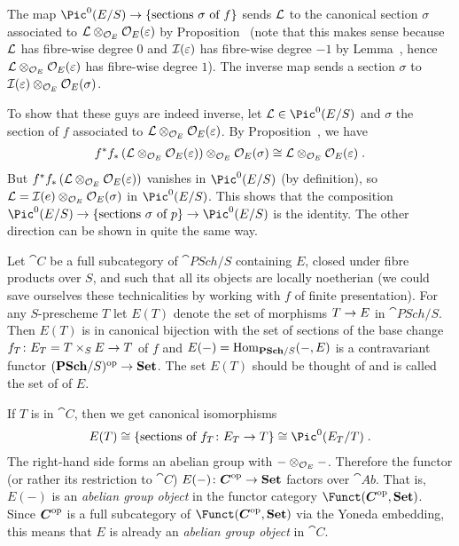 \documentclass[a4paper,parskip=half,numbers=enddot, DIV=12]{scrreprt}
\begin{document}
	The map $\Pic^0(E/S)\morphism\{\text{sections }\sigma\text{ of }f\}$ sends $\mathcal{L}$ to the canonical section $\sigma$ associated to $\mathcal{L}\otimes_{\mathcal{O}_E}\mathcal{O}_E(\varepsilon)$ by Proposition~ (note that this makes sense because $\mathcal{L}$ has fibre-wise degree $0$ and $\mathcal{I}(\varepsilon)$ has fibre-wise degree $-1$ by Lemma~, hence $\mathcal{L}\otimes_{\mathcal{O}_E}\mathcal{O}_E(\varepsilon)$ has fibre-wise degree $1$). The inverse map sends a section $\sigma$ to $\mathcal{I}(\varepsilon)\otimes_{\mathcal{O}_E}\mathcal{O}_E(\sigma)$.
	
	To show that these guys are indeed inverse, let $\Ll\in\Pic^0(E/S)$ and $\sigma$ the section of $f$ associated to $\mathcal{L}\otimes_{\mathcal{O}_E}\mathcal{O}_E(\varepsilon)$. By Proposition~, we have
	\begin{align*}
		f^*f_*\left(\mathcal{L}\otimes_{\mathcal{O}_E}\mathcal{O}_E(\varepsilon)\right)\otimes_{\mathcal{O}_E}\mathcal{O}_E(\sigma)\cong\mathcal{L}\otimes_{\mathcal{O}_E}\mathcal{O}_E(\varepsilon)\;.
	\end{align*}
	But $f^*f_*\left(\mathcal{L}\otimes_{\mathcal{O}_E}\mathcal{O}_E(\varepsilon)\right)$ vanishes in $\Pic^0(E/S)$ (by definition), so $\mathcal{L}=\mathcal{I}(e)\otimes_{\mathcal{O}_E}\mathcal{O}_E(\sigma)$ in $\Pic^0(E/S)$. This shows that the composition $\Pic^0(E/S)\morphism\{\text{sections }\sigma\text{ of }p\}\morphism\Pic^0(E/S)$ is the identity. The other direction can be shown in quite the same way.
	
	Let $\cat C$ be a full subcategory of $\cat{PSch}/S$ containing $E$, closed under fibre products over $S$, and such that all its objects are locally noetherian (we could save ourselves these technicalities by working with $f$ of finite presentation). For any $S$-prescheme $T$ let $E(T)$ denote the set of morphisms $T\morphism E$ in $\cat{PSch}/S$. Then $E(T)$ is in canonical bijection with the set of sections of the base change $f_T\colon E_T=T\times_SE\morphism T$ of $f$ and $E(-)=\Hom_{\cat{PSch}/S}(-,E)$ is a contravariant functor $(\cat{PSch}/S)^\op\morphism\cat{Set}$. The set $E(T)$ should be thought of and is called the set of  of $E$.
	
	If $T$ is in $\cat C$, then we get canonical isomorphisms
	\begin{align*}
		E(T)\cong\left\{\text{sections of }f_T\colon E_T\to T\right\}\cong\Pic^0(E_T/T)\;.
	\end{align*}
	The right-hand side forms an abelian group with $-\otimes_{\mathcal{O}_E}-$. Therefore the functor (or rather its restriction to $\cat C$) $E(-)\colon \cat C^\op\morphism\cat{Set}$ factors over $\cat{Ab}$. That is, $E(-)$ is an \emph{abelian group object} in the functor category $\Funct(\cat{C}^\op,\cat{Set})$. Since $\cat C^\op$ is a full subcategory of $\Funct(\cat{C}^\op,\cat{Set})$ via the Yoneda embedding, this means that $E$ is already an \emph{abelian group object} in $\cat C$.
	
\end{document}
